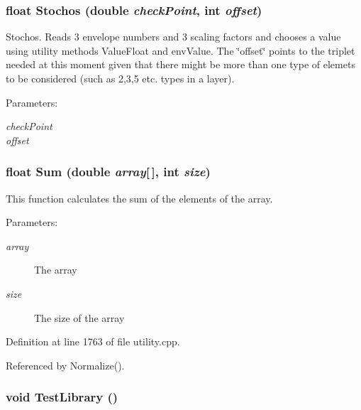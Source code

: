 \subsubsection{\setlength{\rightskip}{0pt plus 5cm}float Stochos (double {\em check\-Point}, int {\em offset})}\label{utility_8h_a10}


Stochos. Reads 3 envelope numbers and 3 scaling factors and chooses a value using utility methods Value\-Float and env\-Value. The \char`\"{}offset\char`\"{} points to the triplet needed at this moment given that there might be more than one type of elemets to be considered (such as 2,3,5 etc. types in a layer). \begin{Desc}
\item[Parameters:]
\begin{description}
\item[{\em check\-Point}]\item[{\em offset}]\end{description}
\end{Desc}
\subsubsection{\setlength{\rightskip}{0pt plus 5cm}float Sum (double {\em array}[$\,$], int {\em size})}\label{utility_8h_a46}


This function calculates the sum of the elements of the array. \begin{Desc}
\item[Parameters:]
\begin{description}
\item[{\em array}]The array \item[{\em size}]The size of the array \end{description}
\end{Desc}


Definition at line 1763 of file utility.cpp.

Referenced by Normalize().
\subsubsection{\setlength{\rightskip}{0pt plus 5cm}void Test\-Library ()}\label{utility_8h_a48}


